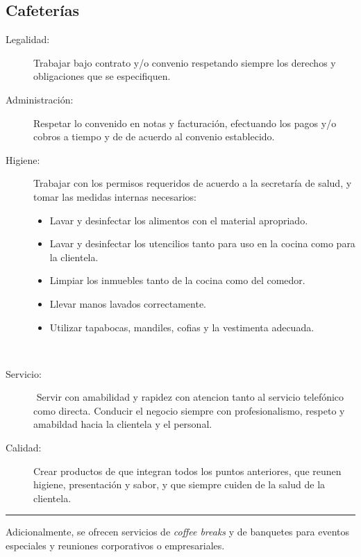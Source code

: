 \documentclass[12pt]{article}
\begin{document}
\subsection*{‬Cafeterías}
\begin{description}
\item[Legalidad:] ‬Trabajar bajo contrato y/o convenio respetando siempre los derechos y obligaciones‭ que se especifiquen.
\item[Administración:] Respetar lo convenido en notas y facturación, efectuando los pagos y/o cobros‎ a tiempo y de de acuerdo al convenio establecido.
\item[Higiene:] Trabajar con los‭ permisos requeridos de acuerdo a la secretaría de salud, y tomar las medidas internas necesarios:
\begin{itemize}
\item Lavar y desinfectar los alimentos con el material apropriado.
\item Lavar y desinfectar los utencilios tanto para uso en la cocina como para la clientela.
\item Limpiar los inmuebles tanto de la cocina como del comedor.
\item Llevar manos lavados correctamente.
\item Utilizar tapabocas, mandiles, cofias y la vestimenta adecuada.
\end{itemize}‎
\item[Servicio:]‬ Servir con amabilidad ‏y rapidez‭ con atencion tanto al servicio telefónico como directa. Conducir el negocio siempre con profesionalismo, respeto y amabildad hacia la clientela y el personal.‎
\item[Calidad:] ‬Crear ‬productos de‭ ‬que integran ‬todos los puntos anteriores, que reunen higiene, presentación y sabor, y que siempre cuiden de la salud de la clientela.
\end{description}\vspace{0.5em}
\begin{center}
\rule{0.3\textwidth}{0.7pt}
\end{center}\vspace{2em}
Adicionalmente, se ofrecen servicios de \emph{coffee breaks} y de banquetes para eventos especiales y reuniones corporativos o empresariales.

\end{document}
